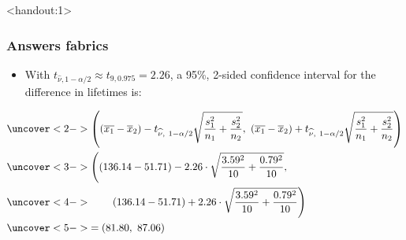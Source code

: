 \documentclass[handout]{beamer}\usepackage{graphicx, color}
\newcommand{\answers}{1}
\providecommand{\ov}[1]{\overline{#1}}
\providecommand{\wh}[1]{\widehat{#1}}
\numberwithin{equation}{section}
\begin{document}
\begin{frame}<handout:\answers>
\frametitle{Answers fabrics} \scriptsize
\begin{itemize}
\item With $t_{\wh{\nu}, 1 - \alpha/2} \approx t_{9, 0.975 }= 2.26$, a 95\%, 2-sided confidence interval for the difference in lifetimes is:
\end{itemize}
\begin{align*}
&\uncover<2->{\left ((\ov{x_1} - \ov{x}_2) - t_{\wh{\nu}, \ 1 - \alpha/2} \sqrt{\frac{s_1^2}{n_1} + \frac{s_2^2}{n_2}} , \ (\ov{x_1} - \ov{x}_2) + t_{\wh{\nu}, \ 1 - \alpha/2} \sqrt{\frac{s^2_1}{n_1} + \frac{s^2_2}{n_2}} \right )} \\
&\uncover<3->{\left ((136.14 - 51.71) - 2.26 \cdot  \sqrt{\frac{3.59^2}{10} + \frac{0.79^2}{10}} , \right .} \\ 
& \uncover<4->{\qquad \left . (136.14 - 51.71) + 2.26 \cdot  \sqrt{\frac{3.59^2}{10} + \frac{0.79^2}{10}} \right )} \\
&\uncover<5->{=  (81.80, \ 87.06) }
\end{align*}
\begin{itemize}
\end{itemize}
\end{frame}
\end{document}
